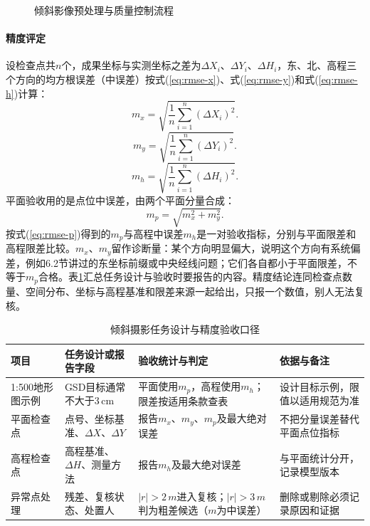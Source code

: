 \begin{figure}[htbp]
\centering
\obliqueImagePreprocessQC
\caption{倾斜影像预处理与质量控制流程}
\label{fig:oblique-preprocess}
\end{figure}

\paragraph{精度评定}设检查点共$n$个，成果坐标与实测坐标之差为$\Delta X_i$、$\Delta Y_i$、$\Delta H_i$，东、北、高程三个方向的均方根误差（中误差）按式(\ref{eq:rmse-x})、式(\ref{eq:rmse-y})和式(\ref{eq:rmse-h})计算：
\begin{equation}
  m_x=\sqrt{\frac{1}{n}\sum_{i=1}^{n}(\Delta X_i)^2}.
  \label{eq:rmse-x}
\end{equation}
\begin{equation}
  m_y=\sqrt{\frac{1}{n}\sum_{i=1}^{n}(\Delta Y_i)^2}.
  \label{eq:rmse-y}
\end{equation}
\begin{equation}
  m_h=\sqrt{\frac{1}{n}\sum_{i=1}^{n}(\Delta H_i)^2}.
  \label{eq:rmse-h}
\end{equation}
平面验收用的是点位中误差，由两个平面分量合成：
\begin{equation}
  m_p=\sqrt{m_x^2+m_y^2}.
  \label{eq:rmse-p}
\end{equation}
按式(\ref{eq:rmse-p})得到的$m_p$与高程中误差$m_h$是一对验收指标，分别与平面限差和高程限差比较。$m_x$、$m_y$留作诊断量：某个方向明显偏大，说明这个方向有系统偏差，例如6.2节讲过的东坐标前缀或中央经线问题；它们各自都小于平面限差，不等于$m_p$合格。表\ref{tab:ch06-aerial-accuracy}汇总任务设计与验收时要报告的内容。精度结论连同检查点数量、空间分布、坐标与高程基准和限差来源一起给出，只报一个数值，别人无法复核。

\begin{table}[htbp]
\centering
\caption{倾斜摄影任务设计与精度验收口径}
\label{tab:ch06-aerial-accuracy}
\small
\begin{tabular}{p{3.1cm}p{3.4cm}p{4.1cm}p{3.0cm}}
\toprule
项目 & 任务设计或报告字段 & 验收统计与判定 & 依据与备注 \\
\midrule
1:500地形图示例 & GSD目标通常不大于3\,cm & 平面使用$m_p$，高程使用$m_h$；限差按适用条款查表 & 设计目标示例，限值以适用规范为准 \\
平面检查点 & 点号、坐标基准、$\Delta X$、$\Delta Y$ & 报告$m_x$、$m_y$、$m_p$及最大绝对误差 & 不把分量误差替代平面点位指标 \\
高程检查点 & 高程基准、$\Delta H$、测量方法 & 报告$m_h$及最大绝对误差 & 与平面统计分开，记录模型版本 \\
异常点处理 & 残差、复核状态、处置人 & $|r|>2\,m$进入复核；$|r|>3\,m$判为粗差候选（$m$为中误差） & 删除或剔除必须记录原因和证据 \\
\bottomrule
\end{tabular}
\end{table}

